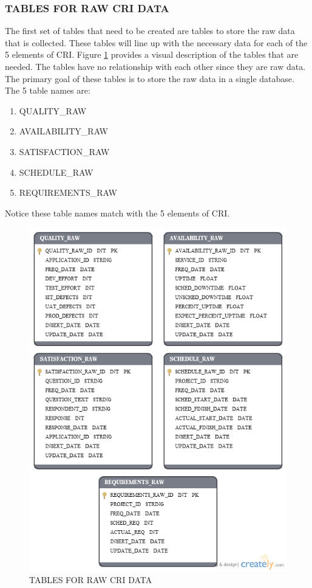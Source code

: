 \documentclass[SDSUThesis.tex]{subfiles}
\begin{document}
   \subsubsection{TABLES FOR RAW CRI DATA}
   
        The first set of tables that need to be created are tables
        to store the raw data that is collected.  These tables
        will line up with the necessary data for each of the 5 elements
        of CRI.  Figure \ref{fig:raw} provides a visual description
        of the tables that are needed.  The tables have no relationship
        with each other since they are raw data.  The primary goal of
        these tables is to store the raw data in a single database. The
        5 table names are:
        \begin{enumerate}
            \item QUALITY\_RAW
            \item AVAILABILITY\_RAW
            \item SATISFACTION\_RAW
            \item SCHEDULE\_RAW
            \item REQUIREMENTS\_RAW
        \end{enumerate}
        Notice these table names match with the 5 elements of CRI.
   
       \begin{figure}[ht]
            \centering
            \includegraphics[scale=.55]{images/raw_tables.png}
            \caption{TABLES FOR RAW CRI DATA}
            \label{fig:raw}
        \end{figure}%
        
\end{document}
